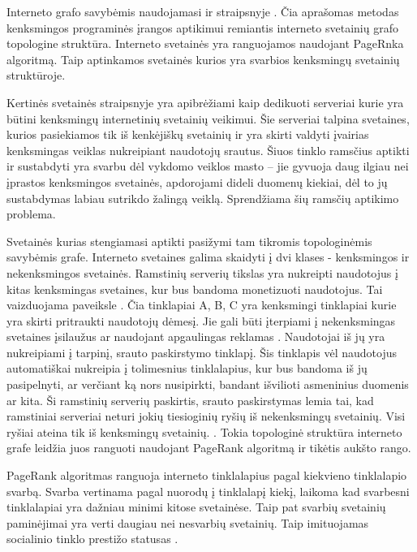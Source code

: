 Interneto grafo savybėmis naudojamasi ir straipsnyje . Čia aprašomas metodas kenksmingos programinės įrangos aptikimui remiantis interneto svetainių grafo topologine struktūra. Interneto svetainės yra ranguojamos naudojant PageRnka algoritmą. Taip aptinkamos svetainės kurios yra svarbios kenksmingų svetainių struktūroje.

Kertinės svetainės straipsnyje \cite{linchpins} yra apibrėžiami kaip dedikuoti serveriai kurie yra būtini kenksmingų internetinių svetainių veikimui. Šie serveriai talpina svetaines, kurios pasiekiamos tik iš kenkėjiškų svetainių ir yra skirti valdyti įvairias kenksmingas veiklas nukreipiant naudotojų srautus. Šiuos tinklo ramsčius aptikti ir sustabdyti yra svarbu dėl vykdomo veiklos masto -- jie gyvuoja daug ilgiau nei įprastos kenksmingos svetainės, apdorojami dideli duomenų kiekiai, dėl to jų sustabdymas labiau sutrikdo žalingą veiklą. Sprendžiama šių ramsčių aptikimo problema.

Svetainės kurias stengiamasi aptikti pasižymi tam tikromis topologinėmis savybėmis grafe. Interneto svetaines galima skaidyti į dvi klases - kenksmingos ir nekenksmingos svetainės. Ramstinių serverių tikslas yra nukreipti naudotojus į kitas kenksmingas svetaines, kur bus bandoma monetizuoti naudotojus. Tai vaizduojama paveiksle . Čia tinklapiai A, B, C yra kenksmingi tinklapiai kurie yra skirti pritraukti naudotojų dėmesį. Jie gali būti įterpiami į nekenksmingas svetaines įsilaužus ar naudojant apgaulingas reklamas \cite{tax}. Naudotojai iš jų yra nukreipiami į tarpinį, srauto paskirstymo tinklapį. Šis tinklapis vėl naudotojus automatiškai nukreipia į tolimesnius tinklalapius, kur bus bandoma iš jų pasipelnyti, ar verčiant ką nors nusipirkti, bandant išvilioti asmeninius duomenis ar kita. Ši ramstinių serverių paskirtis, srauto paskirstymas lemia tai, kad ramstiniai serveriai neturi jokių tiesioginių ryšių iš nekenksmingų svetainių. Visi ryšiai ateina tik iš kenksmingų svetainių. \cite{linchpins}. Tokia topologinė struktūra interneto grafe leidžia juos ranguoti naudojant PageRank algoritmą ir tikėtis aukšto rango.


PageRank algoritmas ranguoja interneto tinklalapius pagal kiekvieno tinklalapio svarbą. Svarba vertinama pagal nuorodų į tinklalapį kiekį, laikoma kad svarbesni tinklalapiai yra dažniau minimi kitose svetainėse. Taip pat svarbių svetainių paminėjimai yra verti daugiau nei nesvarbių svetainių. Taip imituojamas socialinio tinklo prestižo statusas \cite{Wu2008}.

